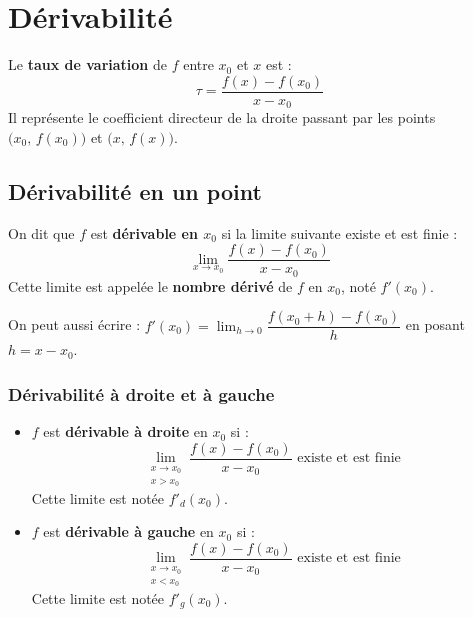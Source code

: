 
\chapter{D\'{e}rivabilit\'{e}}

\begin{rappel}
  Le \textbf{taux de variation} de $f$ entre $x_0$ et $x$ est :
  \[
    \tau = \frac{f(x) - f(x_0)}{x - x_0}
  \]
  Il repr\'{e}sente le coefficient directeur de la droite passant par
  les points $\bigl(x_0,\,f(x_0)\bigr)$ et $\bigl(x,\,f(x)\bigr)$.
\end{rappel}

\section{D\'{e}rivabilit\'{e} en un point}

\begin{definition}
  On dit que $f$ est \textbf{d\'{e}rivable en $x_0$} si la limite suivante
  existe et est finie :
  \[
    \lim_{x \to x_0} \frac{f(x) - f(x_0)}{x - x_0}
  \]
  Cette limite est appel\'{e}e le \textbf{nombre d\'{e}riv\'{e}} de $f$ en $x_0$,
  not\'{e} $f'(x_0)$.
\end{definition}

\begin{remarque}
  \newline
  On peut aussi \'{e}crire : $f'(x_0) = \displaystyle\lim_{h \to 0}
  \dfrac{f(x_0 + h) - f(x_0)}{h}$ \; en posant $h = x - x_0$.
\end{remarque}

\subsection{D\'{e}rivabilit\'{e} \`{a} droite et \`{a} gauche}

\begin{definition}
  \begin{itemize}
    \item $f$ est \textbf{d\'{e}rivable \`{a} droite} en $x_0$ si :
    \[
      \lim_{\substack{x \to x_0 \\ x > x_0}}
      \frac{f(x)-f(x_0)}{x-x_0} \text{ existe et est finie}
    \]
    Cette limite est not\'{e}e $f'_d(x_0)$.

    \medskip
    \item $f$ est \textbf{d\'{e}rivable \`{a} gauche} en $x_0$ si :
    \[
      \lim_{\substack{x \to x_0 \\ x < x_0}}
      \frac{f(x)-f(x_0)}{x-x_0} \text{ existe et est finie}
    \]
    Cette limite est not\'{e}e $f'_g(x_0)$.
  \end{itemize}
\end{definition}

